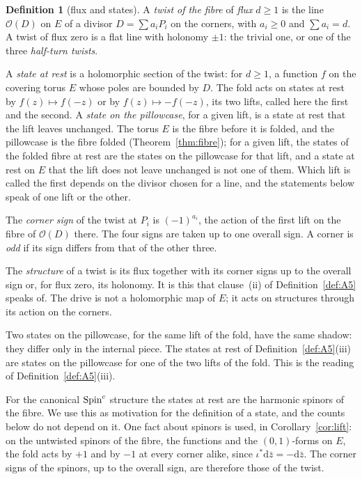 \documentclass[11pt,a4paper]{article}
\theoremstyle{plain}
\theoremstyle{definition}
\newtheorem{definition}[theorem]{Definition}
\theoremstyle{remark}
\begin{document}
\begin{definition}[flux and states]\label{def:states}
A \emph{twist of the fibre} of \emph{flux} $d\geq1$ is the line $\mathcal{O}(D)$ on $E$ of a divisor $D=\sum a_{i}P_{i}$ on the corners, with $a_{i}\geq0$ and $\sum a_{i}=d$. A twist of flux zero is a flat line with holonomy $\pm1$: the trivial one, or one of the three \emph{half-turn twists}.

A \emph{state at rest} is a holomorphic section of the twist: for $d\geq1$, a function $f$ on the covering torus $E$ whose poles are bounded by $D$. The fold acts on states at rest by $f(z)\mapsto f(-z)$ or by $f(z)\mapsto-f(-z)$, its two lifts, called here the first and the second. A \emph{state on the pillowcase}, for a given lift, is a state at rest that the lift leaves unchanged. The torus $E$ is the fibre before it is folded, and the pillowcase is the fibre folded (Theorem~\ref{thm:fibre}); for a given lift, the states of the folded fibre at rest are the states on the pillowcase for that lift, and a state at rest on $E$ that the lift does not leave unchanged is not one of them. Which lift is called the first depends on the divisor chosen for a line, and the statements below speak of one lift or the other.

The \emph{corner sign} of the twist at $P_{i}$ is $(-1)^{a_{i}}$, the action of the first lift on the fibre of $\mathcal{O}(D)$ there. The four signs are taken up to one overall sign. A corner is \emph{odd} if its sign differs from that of the other three.

The \emph{structure} of a twist is its flux together with its corner signs up to the overall sign or, for flux zero, its holonomy. It is this that clause~(ii) of Definition~\ref{def:A5} speaks of. The drive is not a holomorphic map of $E$; it acts on structures through its action on the corners.

Two states on the pillowcase, for the same lift of the fold, have the same shadow: they differ only in the internal piece. The states at rest of Definition~\ref{def:A5}(iii) are states on the pillowcase for one of the two lifts of the fold. This is the reading of Definition~\ref{def:A5}(iii).
\end{definition}

For the canonical $\text{Spin}^c$ structure the states at rest are the harmonic spinors of the fibre. We use this as motivation for the definition of a state, and the counts below do not depend on it. One fact about spinors is used, in Corollary~\ref{cor:lift}: on the untwisted spinors of the fibre, the functions and the $(0,1)$-forms on $E$, the fold acts by $+1$ and by $-1$ at every corner alike, since $\iota^{*}\mathrm{d}\bar z=-\mathrm{d}\bar z$. The corner signs of the spinors, up to the overall sign, are therefore those of the twist.
\end{document}
